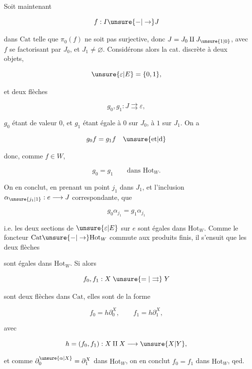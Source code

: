 Soit maintenant

\[
 f:I\unsure{-|\to}J
\]

dans $\mathrm{Cat}$ telle que $\pi_0(f)$ ne soit pas surjective,
donc $J=J_0\amalg J_{\unsure{1|0}}$, avec $f$ se factorisant par
$J_0$, et $J_1\ne\varnothing$. Considérons alors la cat. discrète
à deux objets,

\[
 \unsure{\varepsilon|E}=\{0,1\},
\]

et deux  flèches

\[
 g_0,g_1:J\rightrightarrows\varepsilon,
\]

$g_0$ étant  de valeur $0$, et $g_1$ étant
égale à $0$ sur $J_0$, à $1$ sur $J_1$. On a

\[
 g_0f=g_1f\quad\text{\unsure{et|d}}
\]

donc, comme $f\in W$,

\[
 g_0=g_1\qquad\text{dans }\mathrm{Hot}_{W}.
\]

On en conclut, en prenant un point $j_1$ dans $J_1$,
et l'inclusion $\alpha_{\unsure{j_1|1}}:e\longrightarrow J$ correspondante, que

\[
 g_0\alpha_{j_1}=g_1\alpha_{j_1}
\]

i.e. les deux sections de $\unsure{\varepsilon|E}$ sur $e$ sont égales
dans $\mathrm{Hot}_{W}$. Comme le foncteur $\mathrm{Cat}\unsure{-|\to}\mathrm{Hot}_{W}$
commute aux produits finis, il s'ensuit
que  les deux flèches


sont égales dans $\mathrm{Hot}_{W}$. Si alors

\[
 f_0,f_1:X\mathrel{\unsure{=|\rightrightarrows}}Y
\]

sont deux flèches dans $\mathrm{Cat}$, elles sont de
la forme

\[
 f_0=h\partial_0^X,\qquad f_1=h\partial_1^X,
\]

avec

\[
 h=(f_0,f_1):X\amalg X\longrightarrow\unsure{X|Y},
\]

et comme $\partial_0^{\unsure{\alpha|X}}=\partial_1^X$ dans $\mathrm{Hot}_{W}$, on en
conclut $f_0=f_1$ dans $\mathrm{Hot}_{W}$, qed.

